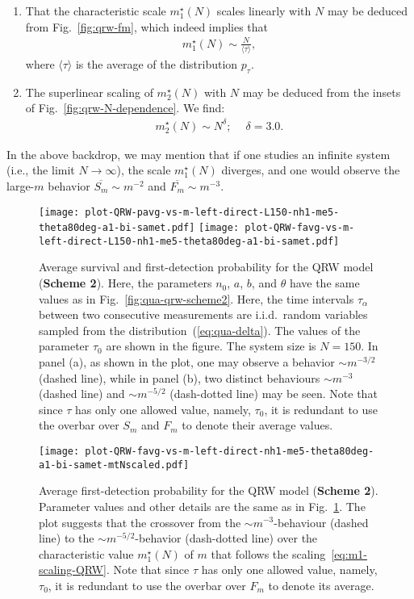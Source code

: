 \documentclass[12pt]{iopart}
\begin{document}
\begin{enumerate}
\item That the characteristic scale $m_1^\star(N)$ scales linearly with $N$ may be deduced from Fig.~\ref{fig:qrw-fm}, which indeed implies that
\begin{align}
m_1^\star(N) \sim \frac{N}{\langle \tau \rangle},
\label{eq:m1-scaling-QRW}
\end{align}
where $\langle \tau\rangle $ is the average of the distribution $p_\tau$. 
\item The superlinear scaling of $m_2^\star(N)$ with $N$ may be deduced from the insets of Fig.~\ref{fig:qrw-N-dependence}.  We find: 
\begin{align}
m_2^\star(N) \sim N^\delta;~\quad\delta=3.0.
\label{eq:m2-scaling-QRW}
\end{align}
\end{enumerate}
In the above backdrop, we may mention that if one studies an infinite system (i.e.,  the limit $N \to \infty$),  the scale $m_1^\star(N)$ diverges,  and one would observe  the large-$m$ behavior $\overline{S_m} \sim m^{-2}$ and $\overline{F_m} \sim m^{-3}$.

\begin{figure}[!htbp]
\centering
\texttt{[image: plot-QRW-pavg-vs-m-left-direct-L150-nh1-me5-theta80deg-a1-bi-samet.pdf]} \hskip5pt 
\texttt{[image: plot-QRW-favg-vs-m-left-direct-L150-nh1-me5-theta80deg-a1-bi-samet.pdf]}   
\caption{Average survival and first-detection probability for the QRW model (\textbf{Scheme 2}).  Here, the parameters $n_0$,  $a$,  $b$,  and $\theta$ have the same values as in Fig.~\ref{fig:qua-qrw-scheme2}.  Here, the time intervals $\tau_\alpha$ between two consecutive
measurements are i.i.d.~random variables sampled from the
        distribution~(\ref{eq:qua-delta}).  The values of the parameter $\tau_0$ are shown in the figure.  The system size
        is $N=150$.  In panel (a),  as shown in the plot, one may observe a behavior $\sim m^{-3/2}$ (dashed line), while in panel (b),  two distinct behaviours $\sim m^{-3}$ (dashed line) and $\sim m^{-5/2}$ (dash-dotted line) may be seen.  Note that since $\tau$ has only one allowed value, namely, $\tau_0$,  it is redundant to use the overbar over $S_m$ and $F_m$ to denote their average values.}
\label{fig:qrw-samet-sp-fp}
\end{figure}

\begin{figure}[!htbp]
\centering
\texttt{[image: plot-QRW-favg-vs-m-left-direct-nh1-me5-theta80deg-a1-bi-samet-mtNscaled.pdf]}   
\caption{Average first-detection probability for the QRW model (\textbf{Scheme 2}). Parameter values and other details are the same as in Fig.~\ref{fig:qrw-samet-sp-fp}.  The plot suggests that the crossover from the $\sim m^{-3}$-behaviour (dashed line) to the $\sim m^{-5/2}$-behavior (dash-dotted line) over the characteristic value $m_1^\star(N)$ of $m$ that follows the scaling~\eqref{eq:m1-scaling-QRW}.  Note that since $\tau$ has only one allowed value, namely, $\tau_0$,  it is redundant to use the overbar over $F_m$ to denote its average.}
\label{fig:qrw-fp-scaled}
\end{figure}
 
\end{document}
